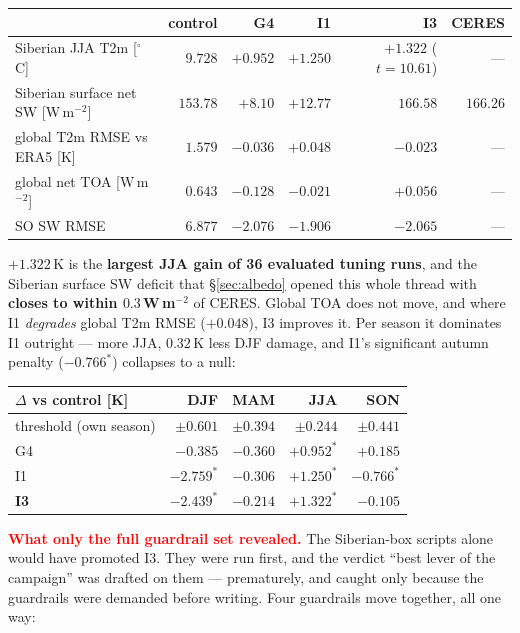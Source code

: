 \documentclass[10pt]{article}
\begin{document}
\begin{center}\footnotesize
\begin{tabular}{l r r r r r}
\toprule
 & control & G4 & I1 & \textbf{I3} & CERES \\
\midrule
Siberian JJA T2m [$^\circ$C] & $9.728$ & $+0.952$ & $+1.250$ & $\mathbf{+1.322}$ ($t{=}10.61$) & --- \\
Siberian surface net SW [W\,m$^{-2}$] & $153.78$ & $+8.10$ & $+12.77$ & $\mathbf{166.58}$ & $\mathbf{166.26}$ \\
global T2m RMSE vs ERA5 [K] & $1.579$ & $-0.036$ & $\mathbf{+0.048}$ & $\mathbf{-0.023}$ & --- \\
global net TOA [W\,m$^{-2}$] & $0.643$ & $-0.128$ & $-0.021$ & $+0.056$ & --- \\
SO SW RMSE & $6.877$ & $-2.076$ & $-1.906$ & $-2.065$ & --- \\
\bottomrule
\end{tabular}
\end{center}

\noindent $+1.322$\,K is the \textbf{largest JJA gain of 36 evaluated tuning runs}, and the
Siberian surface SW deficit that \S\ref{sec:albedo} opened this whole thread with
\textbf{closes to within $0.3$\,W\,m$^{-2}$} of CERES. Global TOA does not move, and where I1
\emph{degrades} global T2m RMSE ($+0.048$), I3 improves it. Per season it dominates I1
outright --- more JJA, $0.32$\,K less DJF damage, and I1's significant autumn penalty
($-0.766^*$) collapses to a null:

\begin{center}\footnotesize
\begin{tabular}{l r r r r}
\toprule
$\Delta$ vs control [K] & DJF & MAM & JJA & SON \\
\midrule
threshold (own season) & $\pm0.601$ & $\pm0.394$ & $\pm0.244$ & $\pm0.441$ \\
G4 & $-0.385$ & $-0.360$ & $+0.952^*$ & $+0.185$ \\
I1 & $-2.759^*$ & $-0.306$ & $+1.250^*$ & $-0.766^*$ \\
\textbf{I3} & $\mathbf{-2.439^*}$ & $-0.214$ & $\mathbf{+1.322^*}$ & $\mathbf{-0.105}$ \\
\bottomrule
\end{tabular}
\end{center}

\textcolor{red}{\textbf{What only the full guardrail set revealed.}} The Siberian-box scripts
alone would have promoted I3. They were run first, and the verdict ``best lever of the
campaign'' was drafted on them --- prematurely, and caught only because the guardrails were
demanded before writing. Four guardrails move together, all one way:
\end{document}

